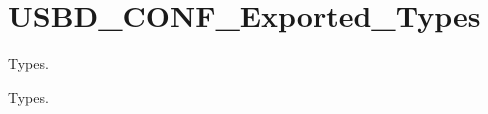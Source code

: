 \hypertarget{group__USBD__CONF__Exported__Types}{}\section{U\+S\+B\+D\+\_\+\+C\+O\+N\+F\+\_\+\+Exported\+\_\+\+Types}
\label{group__USBD__CONF__Exported__Types}


Types.  


Types. 

